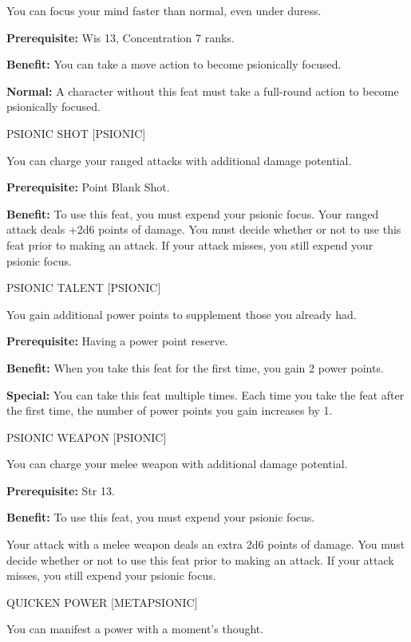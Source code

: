 \documentclass{article}
\begin{document}
You can focus your mind faster than normal, even under duress.

\textbf{Prerequisite:} Wis 13, Concentration 7 ranks.

\textbf{Benefit:} You can take a move action to become psionically focused.

\textbf{Normal:} A character without this feat must take a full-round action to 
become psionically focused.

\vspace{12pt}
PSIONIC SHOT [PSIONIC]

You can charge your ranged attacks with additional damage potential.

\textbf{Prerequisite:} Point Blank Shot.

\textbf{Benefit:} To use this feat, you must expend your psionic focus. Your ranged 
attack deals +2d6 points of damage. You must decide whether or not to use this 
feat prior to making an attack. If your attack misses, you still expend your psionic 
focus.

\vspace{12pt}
PSIONIC TALENT [PSIONIC]

You gain additional power points to supplement those you already had.

\textbf{Prerequisite:} Having a power point reserve.

\textbf{Benefit:} When you take this feat for the first time, you gain 2 power 
points.

\textbf{Special:} You can take this feat multiple times. Each time you take the 
feat after the first time, the number of power points you gain increases by 1.

\vspace{12pt}
PSIONIC WEAPON [PSIONIC]

You can charge your melee weapon with additional damage potential.

\textbf{Prerequisite:} Str 13.

\textbf{Benefit:} To use this feat, you must expend your psionic focus.

Your attack with a melee weapon deals an extra 2d6 points of damage. You must decide 
whether or not to use this feat prior to making an attack. If your attack misses, 
you still expend your psionic focus.

\vspace{12pt}
QUICKEN POWER [METAPSIONIC]

You can manifest a power with a moment's thought.
\end{document}
